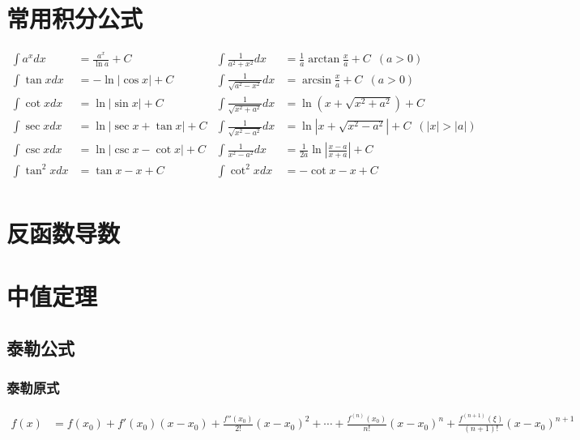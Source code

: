 ﻿\documentclass[a4paper,12pt,UTF8]{ctexart}
\begin{document}
    \section{常用积分公式}
    \begin{align*}
        \int {a}^{x} dx& = \frac{{a}^{x}}{\ln a}+C& \int \frac{1}{a^{2}+x^{2}}dx& = \frac{1}{a}\arctan\frac{x}{a}+C \enspace (a>0)&\\
        \int \tan x dx& = -\ln \left|\cos x \right|+C& \int \frac{1}{\sqrt{a^{2}-x^{2}}}dx& = \arcsin\frac{x}{a}+C \enspace (a>0)&\\
        \int \cot x dx& = \ln \left|\sin x \right|+C& \int \frac{1}{\sqrt{x^{2}+a^{2}}}dx& = \ln\left(x+\sqrt{x^{2}+a^{2}}\right)+C&\\
        \int \sec x dx& = \ln \left|\sec x + \tan x \right|+C& \int \frac{1}{\sqrt{x^{2}-a^{2}}}dx& = \ln\left|x+\sqrt{x^{2}-a^{2}}\right|+C \enspace (\left|x\right|>\left|a\right|)&\\
        \int \csc x dx& = \ln \left|\csc x - \cot x \right|+C& \int \frac{1}{x^{2}-a^{2}}dx& = \frac{1}{2a}\ln\left|\frac{x-a}{x+a}\right|+C&\\
        \int \tan^2 x dx& = \tan x-x+C& \int \cot^2 x dx& = -\cot x-x+C& \\
    \end{align*}

    \section{反函数导数}

    \section{中值定理}

    \subsection{泰勒公式}

    \subsubsection{泰勒原式}
    \begin{align*}
        f(x)& = f(x_0)+f'(x_0)(x-x_0)+\frac{f''(x_0)}{2!}(x-x_0)^2+\cdots+\frac{f^{(n)}(x_0)}{n!}(x-x_0)^n+\frac{f^{(n+1)}(\xi)}{(n+1)!}(x-x_0)^{n+1}&\\
    \end{align*}
\end{document}

